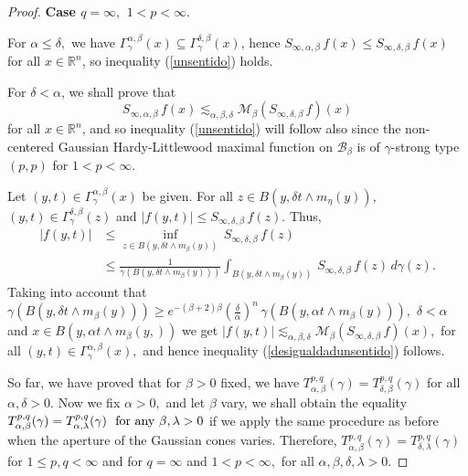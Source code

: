 \documentclass[leqno,11pt]{amsart}
\theoremstyle{plain}
\theoremstyle{remark}
\begin{document}
{\begin{proof}
{\bf Case $q=\infty,$ $1< p<\infty.$}

For $\alpha\le \delta, $ we have $\Gamma_\gamma^{\alpha, \beta}(x)\subseteq \Gamma_{\gamma}^{\delta, \beta}(x)$, hence $S_{\infty,\alpha,\beta}\, f(x)\le S_{\infty,\delta, \beta}\, f(x)$ for all $x\in \mathbb{R}^n$, so inequality (\ref{unsentido}) holds.

For $\delta <\alpha$, we shall prove that \begin{equation}\label{desigualdadunsentido}S_{\infty,\alpha, \beta}\, f(x)\lesssim_{\alpha, \beta, \delta}\mathcal{M}_\beta (S_{\infty, \delta, \beta}\, f)(x)\end{equation}for all $x\in \mathbb{R}^n$, and so inequality (\ref{unsentido}) will follow also since the non-centered Gaussian Hardy-Littlewood maximal function on $\mathscr{B}_\beta$ is of $\gamma$-strong type $(p,p)$ for $1<p<\infty.$

Let $(y,t)\in \Gamma_\gamma^{\alpha,\beta}(x) $ be given. For all $z\in B(y,\delta t\wedge m_\eta (y))$, $(y,t)\in \Gamma_\gamma^{\delta, \beta}(z)$ and $|f(y,t)|\le S_{\infty, \delta, \beta}\, f(z).$ Thus,
\begin{align*}
|f(y,t)|&\le \inf_{z\in B(y,\delta t\wedge m_\beta (y))}\, S_{\infty, \delta, \beta}\, f(z)\\ &\le \frac{1}{\gamma(B(y,\delta t\wedge m_\beta (y)))}\int_{B(y, \delta t\wedge m_\beta (y))}\, S_{\infty, \delta, \beta}\, f(z)\, d\gamma(z).
\end{align*}
Taking into account that $\gamma(B(y,\delta t\wedge m_\beta (y)))\ge e^{-(\beta+2)\beta}\left(\frac{\delta}{\alpha}\right)^n\, \gamma(B(y, \alpha t\wedge m_\beta(y))),$ $\delta< \alpha$ and $x\in B(y,\alpha t\wedge m_\beta (y,))$ we get $|f(y,t)|\lesssim_{\alpha, \beta, \delta}\mathcal{M}_\beta (S_{\infty, \delta,\beta}\, f)(x),$ for all $(y,t)\in \Gamma_\gamma^{\alpha, \beta}(x),$ and hence inequality (\ref{desigualdadunsentido}) follows.

So far, we have proved that for $\beta>0$ fixed, we have $T_{\alpha, \beta}^{p,q}(\gamma)=T_{\delta, \beta}^{p,q}(\gamma)$ for all $\alpha, \delta>0.$ Now we fix $\alpha>0,$ and let $\beta$ vary, we shall obtain the equality $T^{p,q}_{\alpha, \beta}(\gamma)=T_{\alpha,\lambda}^{p,q}(\gamma)\ \hbox{ for any } \beta,\lambda>0$ if we apply the same procedure as before when the aperture of the Gaussian cones varies.
Therefore, $T^{p,q}_{\alpha, \beta}(\gamma)=T^{p,q}_{\delta, \lambda}(\gamma)$ for $1\le p,q<\infty$ and for $q=\infty$ and $1<p<\infty,$ for all $\alpha,\beta, \delta, \lambda>0.$ 


\end{proof}}
\end{document}
